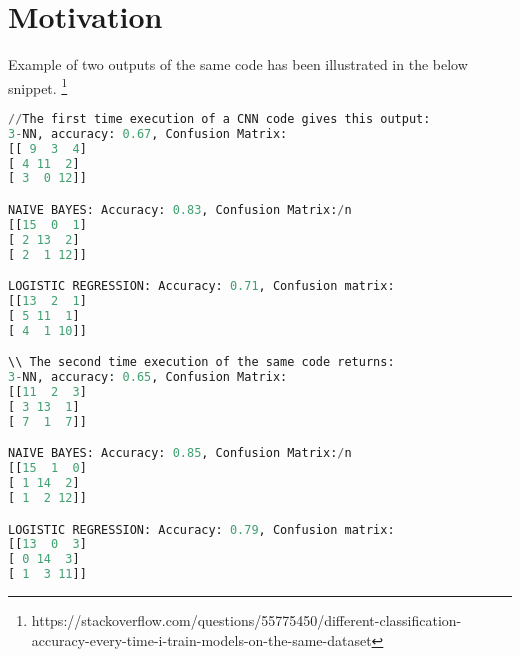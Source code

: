 \section{Motivation}
\label{sec:motivation}
Example of two outputs of the same code has been illustrated in the below snippet. \footnote{https://stackoverflow.com/questions/55775450/different-classification-accuracy-every-time-i-train-models-on-the-same-dataset}

\begin{lstlisting}[language=Python, caption=Motivating example of model verification to interpret accuracy for accountable ML]
//The first time execution of a CNN code gives this output:
3-NN, accuracy: 0.67, Confusion Matrix:
[[ 9  3  4]
[ 4 11  2]
[ 3  0 12]]

NAIVE BAYES: Accuracy: 0.83, Confusion Matrix:/n
[[15  0  1]
[ 2 13  2]
[ 2  1 12]]

LOGISTIC REGRESSION: Accuracy: 0.71, Confusion matrix:
[[13  2  1]
[ 5 11  1]
[ 4  1 10]]

\\ The second time execution of the same code returns:
3-NN, accuracy: 0.65, Confusion Matrix:
[[11  2  3]
[ 3 13  1]
[ 7  1  7]]

NAIVE BAYES: Accuracy: 0.85, Confusion Matrix:/n
[[15  1  0]
[ 1 14  2]
[ 1  2 12]]

LOGISTIC REGRESSION: Accuracy: 0.79, Confusion matrix:
[[13  0  3]
[ 0 14  3]
[ 1  3 11]]
\end{lstlisting}



